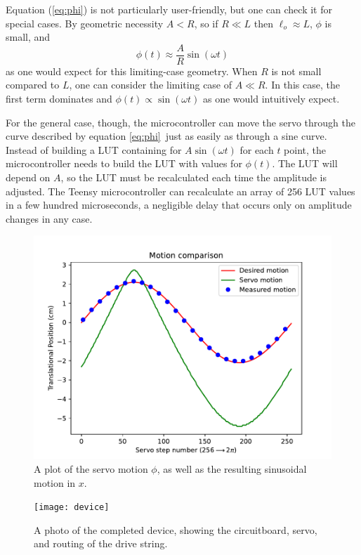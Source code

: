 \documentclass[prb,preprint]{revtex4-1}
\begin{document}
Equation (\ref{eq:phi}) is not particularly user-friendly, but one can check it for special cases. 
By geometric necessity $A<R$, so if $R\ll L$ then $\ell_o \approx L$, $\phi$ is small, and 
\[ \phi(t) \approx \frac{A}{R}\sin(\omega t) \]
as one would expect for this limiting-case geometry.
When $R$ is not small compared to $L$, one can consider the limiting case of $A \ll R$. 
In this case, the first term dominates and $\phi(t) \propto \sin(\omega t)$ as one would intuitively expect. 

For the general case, though, the microcontroller can move the servo through the curve described by equation \ref{eq:phi}\ just as easily as through a sine curve. 
Instead of building a LUT containing for $A\sin(\omega t)$ for each $t$ point, the microcontroller needs to build the LUT with values for $\phi(t)$.
The LUT will depend on $A$, so the LUT must be recalculated each time the amplitude is adjusted. 
The Teensy microcontroller can recalculate an array of 256 LUT values in a few hundred microseconds, a negligible delay that occurs only on amplitude changes in any case.

\begin{figure}[ht]
	\begin{center}
		\includegraphics{comparison}
	\end{center}
	\caption{A plot of the servo motion $\phi$, as well as the resulting sinusoidal motion in $x$.}
	\label{fig:motion}
\end{figure}

\begin{figure}[ht]
	\begin{center}
		\texttt{[image: device]}
	\end{center}
	\caption{A photo of the completed device, showing the circuitboard, servo, and routing of the drive string.}
	\label{fig:device}
\end{figure}
\end{document}
